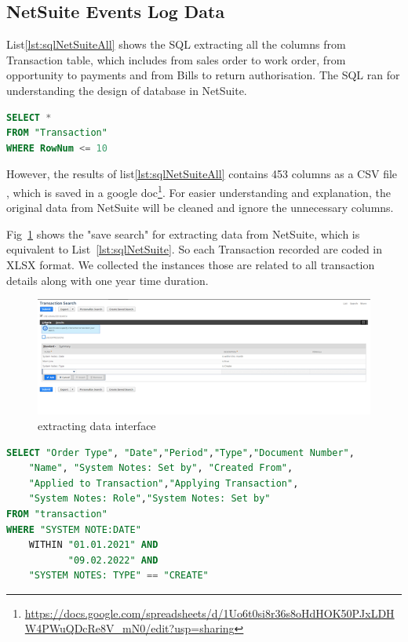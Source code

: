 \subsection{NetSuite Events Log Data}
List\ref{lst:sqlNetSuiteAll} shows the SQL extracting all the columns from Transaction table, which includes from sales order to work order, from opportunity to payments and from Bills to return authorisation. The SQL ran for understanding the design of database in NetSuite.

\begin{lstlisting}[language=SQL, caption={comprehensive data SQL}, label={lst:sqlNetSuiteAll} ]
SELECT *
FROM "Transaction"
WHERE RowNum <= 10
\end{lstlisting}

However,  the results of list\ref{lst:sqlNetSuiteAll} contains 453 columns as a CSV file , which is saved in a google doc\footnote{
\url{https://docs.google.com/spreadsheets/d/1Uo6t0si8r36s8oHdHOK50PJxLDHW4PWuQDcRe8V_mN0/edit?usp=sharing}}.
For  easier understanding and explanation, the original data from NetSuite will be cleaned and ignore the unnecessary columns. 

Fig~\ref{figure:saveSearch} shows the "save search" for extracting data from NetSuite, which is equivalent to List~\ref{lst:sqlNetSuite}.  So each Transaction recorded are coded in XLSX format. We collected the instances those are related to all transaction details along with one year time duration. 


\begin{figure}[!htb]
    \centering 
    \includegraphics[scale=0.7]{resource/data.png}
    \caption{extracting data interface}
    \label{figure:saveSearch}
\end{figure}



\begin{lstlisting}[language=SQL, caption={equal to SQL}, label={lst:sqlNetSuite} ]
SELECT "Order Type", "Date","Period","Type","Document Number",
    "Name", "System Notes: Set by", "Created From", 
    "Applied to Transaction","Applying Transaction", 
    "System Notes: Role","System Notes: Set by"  
FROM "transaction"
WHERE "SYSTEM NOTE:DATE" 
    WITHIN "01.01.2021" AND 
           "09.02.2022" AND 
    "SYSTEM NOTES: TYPE" == "CREATE"
\end{lstlisting}


